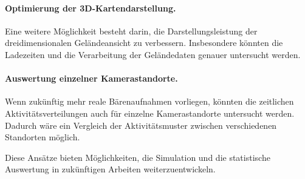 \documentclass[12pt,a4paper]{report}
\begin{document}
\paragraph{Optimierung der 3D-Kartendarstellung.}
Eine weitere Möglichkeit besteht darin,
die Darstellungsleistung der dreidimensionalen
Geländeansicht zu verbessern. Insbesondere
könnten die Ladezeiten und die Verarbeitung
der Geländedaten genauer untersucht werden.

\paragraph{Auswertung einzelner Kamerastandorte.}
Wenn zukünftig mehr reale Bärenaufnahmen
vorliegen, könnten die zeitlichen
Aktivitätsverteilungen auch für einzelne
Kamerastandorte untersucht werden.
Dadurch wäre ein Vergleich der
Aktivitätsmuster zwischen verschiedenen
Standorten möglich.

Diese Ansätze bieten Möglichkeiten,
die Simulation und die statistische
Auswertung in zukünftigen Arbeiten
weiterzuentwickeln.



\clearpage
\printbibliography[
    heading=bibintoc,
    title={Literaturverzeichnis}
]

\clearpage
\thispagestyle{empty}
\end{document}
